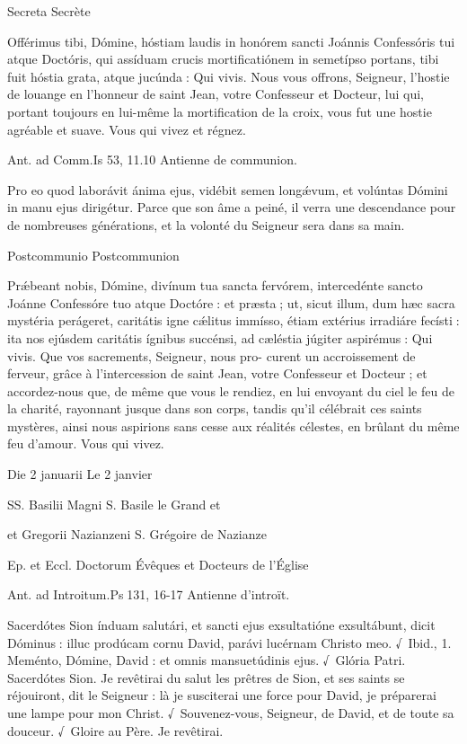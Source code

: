 \begin{paracol}{2}
Secreta
\switchcolumn
Secrète
\switchcolumn*

Offérimus tibi, Dómine, hóstiam  laudis in honórem sancti Joánnis Confessóris tui atque Doctóris, qui assíduam crucis mortificatiónem in semetípso portans, tibi fuit hóstia grata, atque jucúnda : Qui vivis.
\switchcolumn
Nous vous offrons, Seigneur, l’hostie de louange en l’honneur de saint Jean, votre Confesseur et Docteur, lui qui, portant toujours en lui-même la mortification de la croix, vous fut une hostie agréable et suave. Vous qui vivez et régnez.
\switchcolumn*

Ant. ad Comm.\hfill Is 53, 11.10
\switchcolumn
Antienne de communion.
\switchcolumn*

Pro eo quod laborávit ánima ejus, vidébit semen longǽvum, et volúntas Dómini in manu ejus dirigétur.
\switchcolumn
Parce que son âme a peiné, il verra une descendance pour de nombreuses générations, et la volonté du Seigneur sera dans sa main.
\switchcolumn*

Postcommunio
\switchcolumn
Postcommunion
\switchcolumn*

Prǽbeant nobis, Dómine, divínum tua sancta fervórem, intercedénte sancto Joánne Confessóre tuo atque Doctóre : et præsta ; ut, sicut illum, dum hæc sacra mystéria perágeret, caritátis igne cǽlitus immísso, étiam extérius irradiáre fecísti : ita nos ejúsdem caritátis ígnibus succénsi, ad cæléstia júgiter aspirémus : Qui vivis.
\switchcolumn
Que vos sacrements, Seigneur, nous pro- curent un accroissement de ferveur, grâce à l’intercession de saint Jean, votre Confesseur et Docteur ; et accordez-nous que, de même que vous le rendiez, en lui envoyant du ciel le feu de la charité, rayonnant jusque dans son corps, tandis qu’il célébrait ces saints mystères, ainsi nous aspirions sans cesse aux réalités célestes, en brûlant du même feu d’amour. Vous qui vivez.
\switchcolumn*

Die 2 januarii
\switchcolumn
Le 2 janvier
\switchcolumn*

SS. Basilii Magni
\switchcolumn
S. Basile le Grand et
\switchcolumn*

et Gregorii Nazianzeni
\switchcolumn
S. Grégoire de Nazianze
\switchcolumn*

Ep. et Eccl. Doctorum
\switchcolumn
Évêques et Docteurs de l’Église
\switchcolumn*

Ant. ad Introitum.\hfill Ps 131, 16-17
\switchcolumn
Antienne d’introït.
\switchcolumn*

Sacerdótes Sion índuam salutári, et sancti ejus exsultatióne exsultábunt, dicit Dóminus : illuc prodúcam cornu David, parávi lucérnam Christo meo. √~Ibid., 1. Meménto, Dómine, David : et omnis mansuetúdinis ejus. √~Glória Patri. Sacerdótes Sion.
\switchcolumn
Je revêtirai du salut les prêtres de Sion, et  ses saints se réjouiront, dit le Seigneur : là je susciterai une force pour David, je préparerai une lampe pour mon Christ. √~Souvenez-vous, Seigneur, de David, et de toute sa douceur. √~Gloire au Père. Je revêtirai.
\switchcolumn*


\end{paracol}
